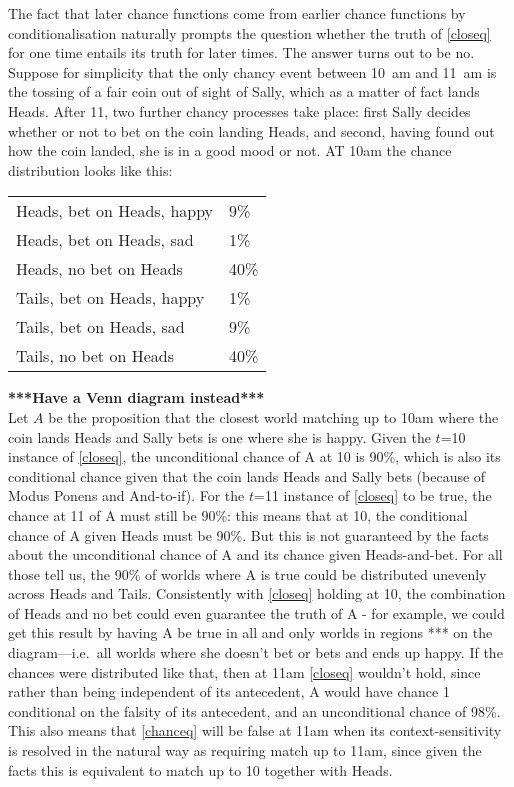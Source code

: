 \documentclass[If.tex]{subfiles}
\begin{document}
The fact that later chance functions come from earlier chance functions by conditionalisation naturally prompts the question whether the truth of \ref{closeq} for one time entails its truth for later times.  The answer turns out to be no.  Suppose for simplicity that the only chancy event between 10~am and 11~am is the tossing of a fair coin out of sight of Sally, which as a matter of fact lands Heads.  After 11, two further chancy processes take place: first Sally decides whether or not to bet on the coin landing Heads, and second, having found out how the coin landed, she is in a good mood or not.  AT 10am the chance distribution looks like this:
\begin{prop}
	\item
	\begin{tabular}{ll}
		Heads, bet on Heads, happy & 9\% \\
		Heads, bet on Heads, sad & 1\% \\
		Heads, no bet on Heads & 40\% \\
		Tails, bet on Heads, happy & 1\% \\
		Tails, bet on Heads, sad & 9\% \\
		Tails, no bet on Heads &40\%
	\end{tabular}
\end{prop}
\textbf{***Have a Venn diagram instead***} \\
Let $A$ be the proposition that the closest world matching up to 10am where the coin lands Heads and Sally bets is one where she is happy.  Given the $t$=10 instance of \ref{closeq}, the unconditional chance of A at 10 is 90\%, which is also its conditional chance given that the coin lands Heads and Sally bets (because of Modus Ponens and And-to-if).  For the $t$=11 instance of \ref{closeq} to be true, the chance at 11 of A must still be 90\%: this means that at 10, the conditional chance of A given Heads must be 90\%.  But this is not guaranteed by the facts about the unconditional chance of A and its chance given Heads-and-bet.  For all those tell us, the 90\% of worlds where A is true could be distributed unevenly across Heads and Tails.  Consistently with \ref{closeq} holding at 10, the combination of Heads and no bet could even guarantee the truth of A - for example, we could get this result by having A be true in all and only worlds in regions *** on the diagram---i.e.\ all worlds where she doesn't bet or bets and ends up happy.  If the chances were distributed like that, then at 11am \ref{closeq} wouldn't hold, since rather than being independent of its antecedent, A would have chance 1 conditional on the falsity of its antecedent, and an unconditional chance of 98\%.  This also means that \ref{chanceq} will be false at 11am when its context-sensitivity is resolved in the natural way as requiring match up to 11am, since given the facts this is equivalent to match up to 10 together with Heads.  
\end{document}
